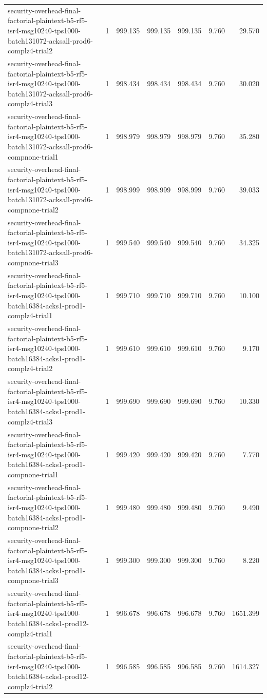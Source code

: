 \begin{tabular}{lrrrrrr}
security-overhead-final-factorial-plaintext-b5-rf5-isr4-msg10240-tps1000-batch131072-acksall-prod6-complz4-trial2 & 1 & 999.135 & 999.135 & 999.135 & 9.760 & 29.570 \\
security-overhead-final-factorial-plaintext-b5-rf5-isr4-msg10240-tps1000-batch131072-acksall-prod6-complz4-trial3 & 1 & 998.434 & 998.434 & 998.434 & 9.760 & 30.020 \\
security-overhead-final-factorial-plaintext-b5-rf5-isr4-msg10240-tps1000-batch131072-acksall-prod6-compnone-trial1 & 1 & 998.979 & 998.979 & 998.979 & 9.760 & 35.280 \\
security-overhead-final-factorial-plaintext-b5-rf5-isr4-msg10240-tps1000-batch131072-acksall-prod6-compnone-trial2 & 1 & 998.999 & 998.999 & 998.999 & 9.760 & 39.033 \\
security-overhead-final-factorial-plaintext-b5-rf5-isr4-msg10240-tps1000-batch131072-acksall-prod6-compnone-trial3 & 1 & 999.540 & 999.540 & 999.540 & 9.760 & 34.325 \\
security-overhead-final-factorial-plaintext-b5-rf5-isr4-msg10240-tps1000-batch16384-acks1-prod1-complz4-trial1 & 1 & 999.710 & 999.710 & 999.710 & 9.760 & 10.100 \\
security-overhead-final-factorial-plaintext-b5-rf5-isr4-msg10240-tps1000-batch16384-acks1-prod1-complz4-trial2 & 1 & 999.610 & 999.610 & 999.610 & 9.760 & 9.170 \\
security-overhead-final-factorial-plaintext-b5-rf5-isr4-msg10240-tps1000-batch16384-acks1-prod1-complz4-trial3 & 1 & 999.690 & 999.690 & 999.690 & 9.760 & 10.330 \\
security-overhead-final-factorial-plaintext-b5-rf5-isr4-msg10240-tps1000-batch16384-acks1-prod1-compnone-trial1 & 1 & 999.420 & 999.420 & 999.420 & 9.760 & 7.770 \\
security-overhead-final-factorial-plaintext-b5-rf5-isr4-msg10240-tps1000-batch16384-acks1-prod1-compnone-trial2 & 1 & 999.480 & 999.480 & 999.480 & 9.760 & 9.490 \\
security-overhead-final-factorial-plaintext-b5-rf5-isr4-msg10240-tps1000-batch16384-acks1-prod1-compnone-trial3 & 1 & 999.300 & 999.300 & 999.300 & 9.760 & 8.220 \\
security-overhead-final-factorial-plaintext-b5-rf5-isr4-msg10240-tps1000-batch16384-acks1-prod12-complz4-trial1 & 1 & 996.678 & 996.678 & 996.678 & 9.760 & 1651.399 \\
security-overhead-final-factorial-plaintext-b5-rf5-isr4-msg10240-tps1000-batch16384-acks1-prod12-complz4-trial2 & 1 & 996.585 & 996.585 & 996.585 & 9.760 & 1614.327 \\

\end{tabular}

